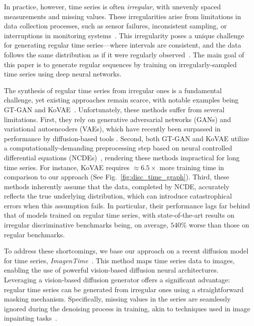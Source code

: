 \documentclass{article}
\theoremstyle{plain}
\theoremstyle{definition}
\theoremstyle{remark}
\begin{document}
In practice, however, time series is often \emph{irregular}, with unevenly spaced measurements and missing values. These irregularities arise from limitations in data collection processes, such as sensor failures, inconsistent sampling, or interruptions in monitoring systems~\cite{kidger2020neural, ren2024learning}. This irregularity poses a unique challenge for generating regular time series---where intervals are consistent, and the data follows the same distribution as if it were regularly observed~\cite{jeon2022gt}. The main goal of this paper is to generate regular sequences by training on irregularly-sampled time series using deep neural networks. 


The synthesis of regular time series from irregular ones is a fundamental challenge, yet existing approaches remain scarce, with notable examples being GT-GAN and KoVAE~\cite{jeon2022gt, naiman2024generative}. Unfortunately, these methods suffer from several limitations. First, they rely on generative adversarial networks (GANs) and variational autoencoders (VAEs), which have recently been surpassed in performance by diffusion-based tools \cite{coletta2023constrained, yuan2024diffusion, naiman2024utilizing}. Second, both GT-GAN and KoVAE utilize a computationally-demanding preprocessing step based on neural controlled differential equations (NCDEs)~\cite{kidger2020neural}, rendering these methods impractical for long time series. For instance, KoVAE requires $\approx 6.5 \times$ more training time in comparison to our approach (See Fig.~\ref{fig:disc_time_graph}). Third, these methods inherently assume that the data, completed by NCDE, accurately reflects the true underlying distribution, which can introduce catastrophical errors when this assumption fails. In particular, their performance lags far behind that of models trained on regular time series, with state-of-the-art results on irregular discriminative benchmarks being, on average, $540\%$ worse than those on regular benchmarks.


To address these shortcomings, we base our approach on a recent diffusion model for time series, \emph{ImagenTime}~\cite{naiman2024utilizing}. This method maps time series data to images, enabling the use of powerful vision-based diffusion neural architectures. Leveraging a vision-based diffusion generator offers a significant advantage: regular time series can be generated from irregular ones using a straightforward masking mechanism. Specifically, missing values in the series are seamlessly ignored during the denoising process in training, akin to techniques used in image inpainting tasks~\cite{lugmayr2022repaint, corneanu2024latentpaint}.
\end{document}
